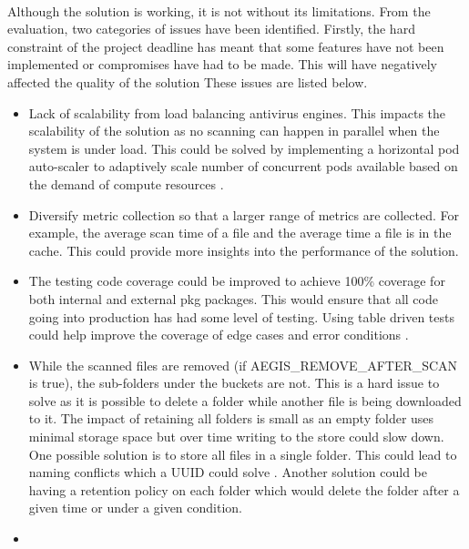 \documentclass[12pt, conference, final, a4paper, onecolumn, compsoc]{IEEEtran}
\begin{document}
\paragraph{}

Although the solution is working, it is not without its limitations. From the
evaluation, two categories of issues have been identified. Firstly, the hard
constraint of the project deadline has meant that some features have not been
implemented or compromises have had to be made. This will have negatively
affected the quality of the solution These issues are listed below.

\begin{itemize}
  \item Lack of scalability from load balancing antivirus engines. This impacts
        the scalability of the solution as no scanning can happen in parallel
        when the system is under load. This could be solved by implementing a
        horizontal pod auto-scaler to adaptively scale number of concurrent pods
        available based on the demand of compute resources \citep{scale-pods}.
  \item Diversify metric collection so that a larger range of metrics are
        collected. For example, the average scan time of a file and the average
        time a file is in the cache. This could provide more insights into the
        performance of the solution.
  \item The testing code coverage could be improved to achieve 100\% coverage
        for both internal and external pkg packages. This would ensure that all
        code going into production has had some level of testing. Using table
        driven tests could help improve the coverage of edge cases and error
        conditions \citep{table-driven-tests}.
  \item While the scanned files are removed (if AEGIS\_REMOVE\_AFTER\_SCAN is
        true), the sub-folders under the buckets are not. This is a hard issue
        to solve as it is possible to delete a folder while another file is
        being downloaded to it. The impact of retaining all folders is small as
        an empty folder uses minimal storage space but over time writing to the
        store could slow down. One possible solution is to store all files in a
        single folder. This could lead to naming conflicts which a UUID could
        solve \citep{UUID}. Another solution could be having a retention policy
        on each folder which would delete the folder after a given time or under
        a given condition.
  \item
\end{itemize}
\end{document}
